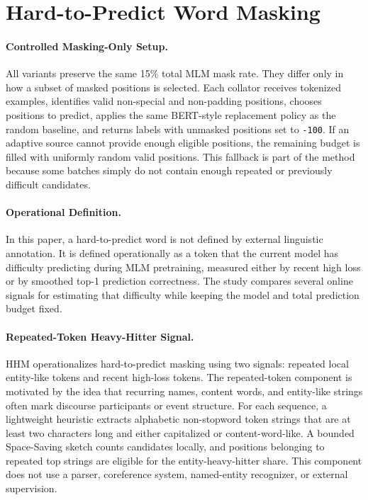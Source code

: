 \section{Hard-to-Predict Word Masking}

\paragraph{Controlled Masking-Only Setup.}
All variants preserve the same 15\% total MLM mask rate. They differ only in how a subset of masked positions is selected. Each collator receives tokenized examples, identifies valid non-special and non-padding positions, chooses positions to predict, applies the same BERT-style replacement policy as the random baseline, and returns labels with unmasked positions set to \texttt{-100}. If an adaptive source cannot provide enough eligible positions, the remaining budget is filled with uniformly random valid positions. This fallback is part of the method because some batches simply do not contain enough repeated or previously difficult candidates.

\paragraph{Operational Definition.}
In this paper, a hard-to-predict word is not defined by external linguistic annotation. It is defined operationally as a token that the current model has difficulty predicting during MLM pretraining, measured either by recent high loss or by smoothed top-1 prediction correctness. The study compares several online signals for estimating that difficulty while keeping the model and total prediction budget fixed.

\paragraph{Repeated-Token Heavy-Hitter Signal.}
HHM operationalizes hard-to-predict masking using two signals: repeated local entity-like tokens and recent high-loss tokens. The repeated-token component is motivated by the idea that recurring names, content words, and entity-like strings often mark discourse participants or event structure. For each sequence, a lightweight heuristic extracts alphabetic non-stopword token strings that are at least two characters long and either capitalized or content-word-like. A bounded Space-Saving sketch counts candidates locally, and positions belonging to repeated top strings are eligible for the entity-heavy-hitter share. This component does not use a parser, coreference system, named-entity recognizer, or external supervision.

